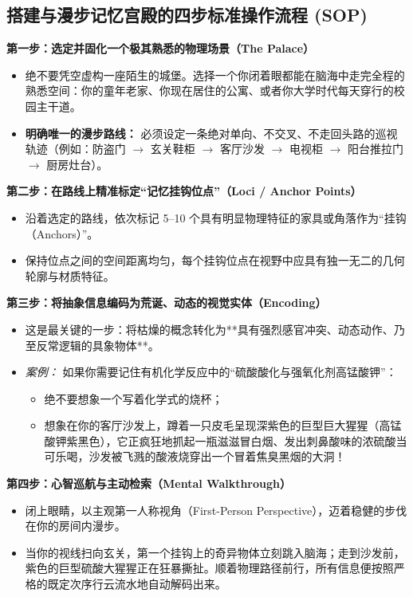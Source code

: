 \documentclass[12pt,a4paper,openany]{ctexbook}
\begin{document}
\subsection*{搭建与漫步记忆宫殿的四步标准操作流程 (SOP)}

\begin{practicebox}[记忆宫殿实战营建指南]
\textbf{第一步：选定并固化一个极其熟悉的物理场景（The Palace）}
\begin{itemize}
    \item 绝不要凭空虚构一座陌生的城堡。选择一个你闭着眼都能在脑海中走完全程的熟悉空间：你的童年老家、你现在居住的公寓、或者你大学时代每天穿行的校园主干道。
    \item \textbf{明确唯一的漫步路线：} 必须设定一条绝对单向、不交叉、不走回头路的巡视轨迹（例如：防盗门 $\rightarrow$ 玄关鞋柜 $\rightarrow$ 客厅沙发 $\rightarrow$ 电视柜 $\rightarrow$ 阳台推拉门 $\rightarrow$ 厨房灶台）。
\end{itemize}

\textbf{第二步：在路线上精准标定“记忆挂钩位点”（Loci / Anchor Points）}
\begin{itemize}
    \item 沿着选定的路线，依次标记 5--10 个具有明显物理特征的家具或角落作为“挂钩（Anchors）”。
    \item 保持位点之间的空间距离均匀，每个挂钩位点在视野中应具有独一无二的几何轮廓与材质特征。
\end{itemize}

\textbf{第三步：将抽象信息编码为荒诞、动态的视觉实体（Encoding）}
\begin{itemize}
    \item 这是最关键的一步：将枯燥的概念转化为**具有强烈感官冲突、动态动作、乃至反常逻辑的具象物体**。
    \item \emph{案例：} 如果你需要记住有机化学反应中的“硫酸酸化与强氧化剂高锰酸钾”：
    \begin{itemize}
        \item 绝不要想象一个写着化学式的烧杯；
        \item 想象在你的客厅沙发上，蹲着一只皮毛呈现深紫色的巨型巨大猩猩（高锰酸钾紫黑色），它正疯狂地抓起一瓶滋滋冒白烟、发出刺鼻酸味的浓硫酸当可乐喝，沙发被飞溅的酸液烧穿出一个冒着焦臭黑烟的大洞！
    \end{itemize}
\end{itemize}

\textbf{第四步：心智巡航与主动检索（Mental Walkthrough）}
\begin{itemize}
    \item 闭上眼睛，以主观第一人称视角（First-Person Perspective），迈着稳健的步伐在你的房间内漫步。
    \item 当你的视线扫向玄关，第一个挂钩上的奇异物体立刻跳入脑海；走到沙发前，紫色的巨型硫酸大猩猩正在狂暴撕扯。顺着物理路径前行，所有信息便按照严格的既定次序行云流水地自动解码出来。
\end{itemize}
\end{practicebox}
\end{document}
